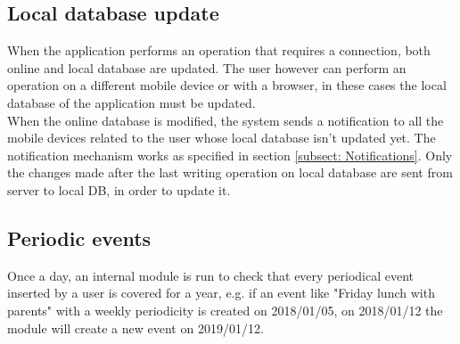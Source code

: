 \subsection{Local database update}
\label{subsect:Local database update}
When the application performs an operation that requires a connection, both online and local database are updated. The user however can perform an operation on a different mobile device or with a browser, in these cases the local database of the application must be updated.\\
When the online database is modified, the system sends a notification to all the mobile devices related to the user whose local database isn't updated yet. The notification mechanism works as specified in section \ref{subsect: Notifications}. Only the changes made after the last writing operation on local database are sent from server to local DB, in order to update it.

\subsection{Periodic events}
\label{subsect:Periodic events}
Once a day, an internal module is run to check that every periodical event inserted by a user is covered for a year, e.g. if an event like "Friday lunch with parents" with a weekly periodicity is created on 2018/01/05, on 2018/01/12 the module will create a new event on 2019/01/12.
